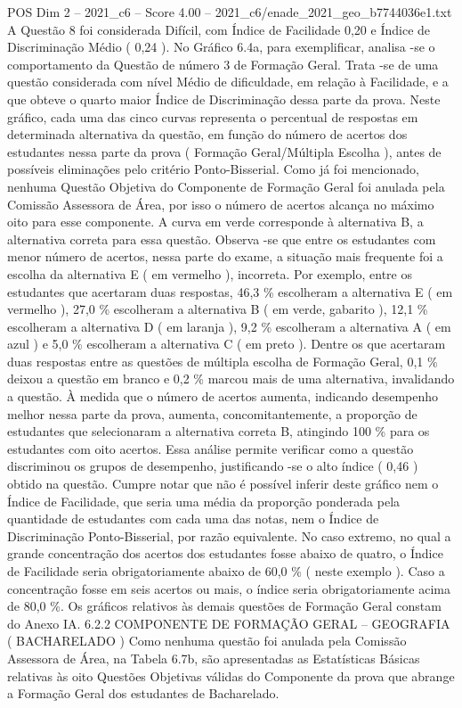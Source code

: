 \begin{textsample}{POS Dim 2 – 2021\_c6 – Score 4.00 – 2021\_c6/enade\_2021\_geo\_b7744036e1.txt}
A Questão 8 foi considerada Difícil, com Índice de Facilidade 0,20 e Índice de Discriminação Médio ( 0,24 ).
No Gráfico 6.4a, para exemplificar, analisa -se o comportamento da Questão de número 3 de Formação Geral.
Trata -se de uma questão considerada com nível Médio de dificuldade, em relação à Facilidade, e a que obteve o quarto maior Índice de Discriminação dessa parte da prova.
Neste gráfico, cada uma das cinco curvas representa o percentual de respostas em determinada alternativa da questão, em função do número de acertos dos estudantes nessa parte da prova ( Formação Geral/Múltipla Escolha ), antes de possíveis eliminações pelo critério Ponto-Bisserial.
Como já foi mencionado, nenhuma Questão Objetiva do Componente de Formação Geral foi anulada pela Comissão Assessora de Área, por isso o número de acertos alcança no máximo oito para esse componente.
A curva em verde corresponde à alternativa B, a alternativa correta para essa questão.
Observa -se que entre os estudantes com menor número de acertos, nessa parte do exame, a situação mais frequente foi a escolha da alternativa E ( em vermelho ), incorreta.
Por exemplo, entre os estudantes que acertaram duas respostas, 46,3 \% escolheram a alternativa E ( em vermelho ), 27,0 \% escolheram a alternativa B ( em verde, gabarito ), 12,1 \% escolheram a alternativa D ( em laranja ), 9,2 \% escolheram a alternativa A ( em azul ) e 5,0 \% escolheram a alternativa C ( em preto ).
Dentre os que acertaram duas respostas entre as questões de múltipla escolha de Formação Geral, 0,1 \% deixou a questão em branco e 0,2 \% marcou mais de uma alternativa, invalidando a questão.
À medida que o número de acertos aumenta, indicando desempenho melhor nessa parte da prova, aumenta, concomitantemente, a proporção de estudantes que selecionaram a alternativa correta B, atingindo 100 \% para os estudantes com oito acertos.
Essa análise permite verificar como a questão discriminou os grupos de desempenho, justificando -se o alto índice ( 0,46 ) obtido na questão.
Cumpre notar que não é possível inferir deste gráfico nem o Índice de Facilidade, que seria uma média da proporção ponderada pela quantidade de estudantes com cada uma das notas, nem o Índice de Discriminação Ponto-Bisserial, por razão equivalente.
No caso extremo, no qual a grande concentração dos acertos dos estudantes fosse abaixo de quatro, o Índice de Facilidade seria obrigatoriamente abaixo de 60,0 \% ( neste exemplo ).
Caso a concentração fosse em seis acertos ou mais, o índice seria obrigatoriamente acima de 80,0 \%.
Os gráficos relativos às demais questões de Formação Geral constam do Anexo IA. 6.2.2 COMPONENTE DE FORMAÇÃO GERAL – GEOGRAFIA ( BACHARELADO ) Como nenhuma questão foi anulada pela Comissão Assessora de Área, na Tabela 6.7b, são apresentadas as Estatísticas Básicas relativas às oito Questões Objetivas válidas do Componente da prova que abrange a Formação Geral dos estudantes de Bacharelado.

\end{textsample}

